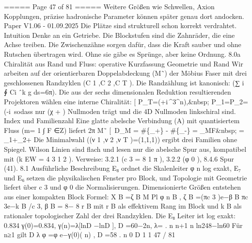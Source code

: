 \begin{MyVerbatim}
{===== Page 47 of 81 =====
Weitere Größen wie Schwellen, Axion Kopplungen, präzise hadronische Parameter können später genau dort andocken.
Paper V1.06 - 01.09.2025
Die Plätze sind strukturell schon korrekt verdrahtet.
Intuition
Denke an ein Getriebe. Die Blockstufen sind die Zahnräder, die eine Achse treiben. Die Zwischenzähne sorgen dafür,
dass die Kraft sauber und ohne Rutschen übertragen wird. Ohne sie gäbe es Sprünge, aber keine Ordnung.
8.0a Chiralität aus Rand und Fluss: operative Kurzfassung
Geometrie und Rand
Wir arbeiten auf der orientierbaren Doppelabdeckung
(M˜)
der Möbius Faser mit drei geschlossenen Randzyklen
(C 1 ,C 2 ,C T ). Die Randzählung ist kanonisch: (∑ i ∮ Ci ˆk g ds=6π).
Die aus der sechs dimensionalen Reduktion resultierenden Projektoren wählen eine interne Chiralität:
[ P_{T}=\!\left(+\mathrm i\,\sigma^{3}\sigma^{n}\right),\quad&nbsp; P_{1}=P_{2}=\!\left(-\mathrm i\
sodass nur (χ + ) Nullmoden trägt und die 4D Nullmoden linkschiral sind.
Index und Familienzahl
Eine glatte abelsche Verbindung (A) mit quantisiertem Fluss (m= 1 ∫ F ∈Z) liefert
2π M˜
[ \,D_{\widetilde M} = \#\{\chi_{+}\} - \#\{\chi_{-}\} = \!\int_{\widetilde M}\!F&nbsp; = \nu_{1}+\nu_{2}+
Die Minimalwahl ((ν 1 ,ν 2 ,ν T )=(1,1,1)) ergibt drei Familien ohne Spiegel.
Wilson Linien sind flach und lesen nur die abelsche Spur aus, kompatibel mit (k EW = 4 3 1 2 ). Verweise: 3.2.1 (c 3 = 8 1 π ),
3.2.2 (φ 0 ), 8.4.6 Spur (41).
8.1 Ausführliche Beschreibung
E₈ ordnet die Skalenleiter φ n log exakt, E₇ und E₆ setzen die physikalischen Fenster pro Block, und Topologie mit
Geometrie liefert über c 3 und φ 0 die Normalisierungen. Dimensionierte Größen entstehen aus einer kompakten Block
Formel:
X B =ζ B M Pl φ n B , ζ B =(πc 3 )e−β B πc 3e−k B /c 3, β B = 8− 8 r B
mit r B als effektivem Rang im Block und k B als rationaler topologischer Zahl der drei Randzyklen.
Die E₈ Leiter ist log exakt:
0.834
γ(0)=0.834, γ(n)=λ[lnD −lnD ], D =60−2n, λ= .
n n+1 n ln248−ln60
Für n≥1 gilt
D λ
φ =φ e−γ(0)( n) , D =58 .
n 0 D 1
1
47 / 81

}
\end{MyVerbatim}

